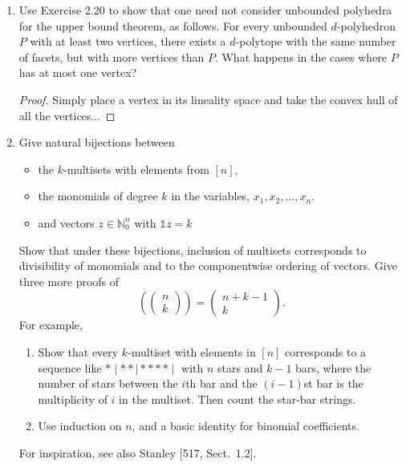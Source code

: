 \documentclass{article}
\begin{document}
\begin{enumerate}
\begin{proof}
\begin{enumerate}[label=(\roman*)]
\item We first assume $d=j$; the equation becomes 
\[\sum_{i=0}^d (-1)^{d-i}\binom{n}{i} = \binom{n-1}{d}\]
which is obvious by inducting on $n$. Now set $j=0$ and obtain the obvious $1=1$. Now we induct on $d$, but this follows immediately because of the Pascal identity $\binom{d}{r} = \binom{d-1}{r} + \binom{d-1}{r-1}$. The computation for the $h$-vector of simplicial neighborly polytopes as in Definition 8.18 follows immediately.

\end{enumerate}
\end{proof}

\item Use Exercise 2.20 to show that one need not consider unbounded polyhedra for the upper bound theorem, as follows. For every unbounded $d$-polyhedron $P$ with at least two vertices, there exists a $d$-polytope with the same number of facets, but with more vertices than $P$. What happens in the cases where $P$ has at most one vertex?

\begin{proof}
Simply place a vertex in its lineality space and take the convex hull of all the vertices...

\end{proof}

\item Give natural bijections between 
\begin{itemize}
    \item the $k$-multisets with elements from $[n]$,
    \item the monomials of degree $k$ in the variables, $x_1,x_2,\dots,x_n$.
    \item and vectors $z\in \mathbb{N}_0^n$ with $\mathds{1}z=k$
\end{itemize}
Show that under these bijections, inclusion of multisets corresponds to divisibility of monomials and to the componentwise ordering of vectors. Give three more proofs of
\[
\left(\!\!\begin{pmatrix} n \\ k \end{pmatrix}\!\!\right)=\begin{pmatrix} n+k-1 \\ k \end{pmatrix}.
\]
For example, \begin{enumerate}[label=(\roman*)]
\item Show that every $k$-multiset with elements in $[n]$ corresponds to a sequence like $\ast\mid\ast\ast\mid\ast\ast\ast\ast\mid$ with $n$ stars and $k-1$ bars, where the number of stars between the $i$th bar and the $(i-1)$st bar is the multiplicity of $i$ in the multiset. Then count the star-bar strings.
\item Use induction on $n$, and a basic identity for binomial coefficients.
\end{enumerate}
For inspiration, see also Stanley [517, Sect.~1.2].


\end{enumerate}
\end{document}
